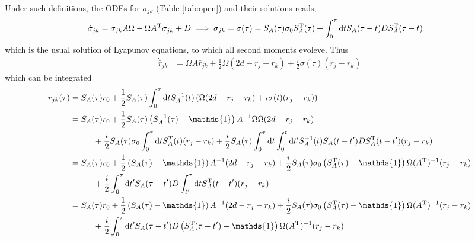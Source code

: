 \documentclass[%
reprint,
superscriptaddress,
nofootinbib,
 amsmath,amssymb,
prx,
floatfix,
]{revtex4-2}
\begin{document}
Under such definitions, the ODEs for $\sigma_{jk}$ (Table \ref{tab:open}) and their solutions reads,
\begin{align}
    \dot{\sigma}_{jk} &=   \sigma_{jk}  A \Omega  -   \Omega  A^{\rm T}   \sigma_{jk}  + D   \implies \sigma_{jk} = \sigma(\tau) = S_A(\tau) \sigma_0 S_A^{\rm T}(\tau) + \int_{0}^{\tau} \text{d}t S_A(\tau - t) D S^{\rm T}_A(\tau - t)
\end{align}
which is the usual solution of Lyapunov equations, to which all second moments evoleve. Thus 
\begin{align}
     \dot{\bar{r}}_{jk} &=    \Omega A  \bar{r}_{jk}  + \frac{1}{2} \Omega (2 d - r_j - r_k)  +  \frac{i}{2}    \sigma(\tau) (r_j - r_k)   
\end{align}
which can be integrated 
\begin{align*}
    \bar{r}_{jk} (\tau) &= S_A (\tau) r_0  + \frac{1}{2}   S_A(\tau)  \int_0^{\tau} \text{d} t  S_A^{-1}(t) \left( \Omega (2d - r_j - r_k) + i  \sigma (t) (r_j - r_k)  \right)  \\ 
    &= S_A (\tau) r_0  + \frac{1}{2}   S_A(\tau)  \left(S_A^{-1}(\tau) - \mathds{1} \right) A^{-1} \Omega \Omega (2d - r_j - r_k) \\
    &\hspace{1cm} +  \frac{i}{2} S_A(\tau)  \sigma_0 \int_0^{\tau} \text{d} t  S_A^{T}(t)  (r_j - r_k)   + \frac{i}{2} S_A(\tau) \int_0^{\tau} \text{d}t \int_{0}^{t}  \text{d} t'  S_A^{-1}(t) S_A(t-t')D S^{\rm T}_A(t - t')   (r_j - r_k)    \\ 
    &= S_A (\tau) r_0   + \frac{1}{2}     \left(S_A(\tau) - \mathds{1} \right) A^{-1}  (2d - r_j - r_k) + 
    \frac{i}{2} S_A (\tau) \sigma_0 \left( S_A^{\rm T} (\tau) - \mathds{1}  \right) \Omega (A^{\rm T})^{-1}  (r_j - r_k)   \\
    &\hspace{1cm} + \frac{i}{2} \int_0^{\tau} \text{d}t'  S_A(\tau- t') D \int_{t'}^{\tau}  \text{d} t S^{\rm T}_A(t- t')(r_j - r_k)  \\
      &=S_A (\tau) r_0  + \frac{1}{2}     \left(S_A(\tau) - \mathds{1} \right) A^{-1}  ( 2 d - r_j - r_k) + 
    \frac{i}{2} S_A (\tau) \sigma_0 \left( S_A^{\rm T} (\tau) - \mathds{1}  \right) \Omega (A^{\rm T})^{-1}  (r_j - r_k)   \\
    &\hspace{1cm} + \frac{i}{2}  \int_0^{\tau} \text{d}t'  S_A(\tau- t') D \left( S^{\rm T}_A(\tau - t') - \mathds{1} \right) \Omega (A^{\rm T})^{-1} (r_j - r_k) 
\end{align*}
\end{document}
